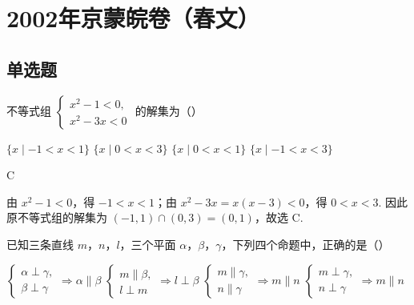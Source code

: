 \chapter{2002年京蒙皖卷（春文）}

\section{单选题}

\begin{problem}
不等式组 \(\begin{cases}
x^{2}-1<0,\\
x^{2}-3x<0
\end{cases}\) 的解集为（\quad）

\choices
    {\(\{x\mid -1<x<1\}\)}
    {\(\{x\mid 0<x<3\}\)}
    {\(\{x\mid 0<x<1\}\)}
    {\(\{x\mid -1<x<3\}\)}
\end{problem}

\begin{answer}
C
\end{answer}

\begin{solution}
由 \(x^{2}-1<0\)，得 \(-1<x<1\)；由 \(x^{2}-3x=x\left(x-3\right)<0\)，得 \(0<x<3\). 因此原不等式组的解集为 \(\left(-1,1\right)\cap\left(0,3\right)=\left(0,1\right)\)，故选 C.
\end{solution}

\begin{problem}
已知三条直线 \(m\)，\(n\)，\(l\)，三个平面 \(\alpha\)，\(\beta\)，\(\gamma\)，下列四个命题中，正确的是（\quad）

\choices
    {\(\begin{cases}
\alpha\perp\gamma,\\
\beta\perp\gamma
\end{cases}\Rightarrow\alpha\parallel\beta\)}
    {\(\begin{cases}
m\parallel\beta,\\
l\perp m
\end{cases}\Rightarrow l\perp\beta\)}
    {\(\begin{cases}
m\parallel\gamma,\\
n\parallel\gamma
\end{cases}\Rightarrow m\parallel n\)}
    {\(\begin{cases}
m\perp\gamma,\\
n\perp\gamma
\end{cases}\Rightarrow m\parallel n\)}
\end{problem}

